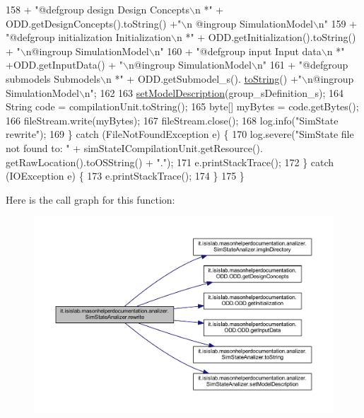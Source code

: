 \begin{DoxyCode}
158                     + \textcolor{stringliteral}{"@defgroup design Design Concepts\(\backslash\)n *"} + ODD.getDesignConcepts().toString() +\textcolor{stringliteral}{"\(\backslash\)n
      @ingroup SimulationModel\(\backslash\)n"}
159                     + \textcolor{stringliteral}{"@defgroup initialization Initialization\(\backslash\)n *"} + ODD.getInitialization().toString() + \textcolor{stringliteral}{
      "\(\backslash\)n@ingroup SimulationModel\(\backslash\)n"}
160                     + \textcolor{stringliteral}{"@defgroup input Input data\(\backslash\)n *"} +ODD.getInputData() + \textcolor{stringliteral}{"\(\backslash\)n@ingroup SimulationModel\(\backslash\)n"}
161                     + \textcolor{stringliteral}{"@defgroup submodels Submodels\(\backslash\)n *"} + ODD.getSubmodel\_s().
      \hyperlink{classit_1_1isislab_1_1masonhelperdocumentation_1_1analizer_1_1_sim_state_analizer_adc78b00761532b2b5cc84a075a1adc5f}{toString}() +\textcolor{stringliteral}{"\(\backslash\)n@ingroup SimulationModel\(\backslash\)n"};
162 
163             \hyperlink{classit_1_1isislab_1_1masonhelperdocumentation_1_1analizer_1_1_sim_state_analizer_a72ee1f15571941f5c588b71fd3265ab0}{setModelDescription}(group\_sDefinition\_s);
164             String code = compilationUnit.toString();
165             byte[] myBytes = code.getBytes();
166             fileStream.write(myBytes);
167             fileStream.close();
168             log.info(\textcolor{stringliteral}{"SimState rewrite"});
169         \} \textcolor{keywordflow}{catch} (FileNotFoundException e) \{
170             log.severe(\textcolor{stringliteral}{"SimState file not found to: "} + simStateICompilationUnit.getResource().
      getRawLocation().toOSString() + \textcolor{stringliteral}{"."});
171             e.printStackTrace();
172         \} \textcolor{keywordflow}{catch} (IOException e) \{
173             e.printStackTrace();
174         \}       
175     \}
\end{DoxyCode}


Here is the call graph for this function\-:
\nopagebreak
\begin{figure}[H]
\begin{center}
\leavevmode
\includegraphics[width=350pt]{classit_1_1isislab_1_1masonhelperdocumentation_1_1analizer_1_1_sim_state_analizer_aa91938db714ec7b05134139ce741e61d_cgraph}
\end{center}
\end{figure}


